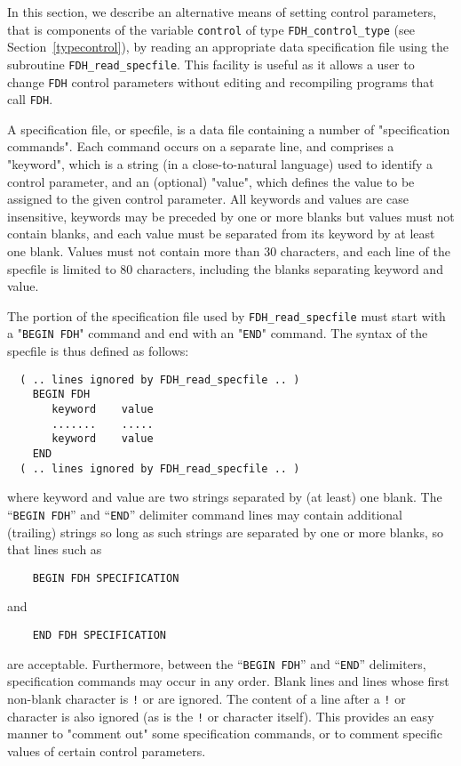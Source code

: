 \documentclass{galahad}
\newcommand{\packagename}{FDH}
\begin{document}

\galfeatures
\noindent In this section, we describe an alternative means of setting 
control parameters, that is components of the variable {\tt control} of type
{\tt \packagename\_control\_type}
(see Section~\ref{typecontrol}), 
by reading an appropriate data specification file using the
subroutine {\tt \packagename\_read\_specfile}. This facility
is useful as it allows a user to change  {\tt \packagename} control parameters 
without editing and recompiling programs that call {\tt \packagename}.

A specification file, or specfile, is a data file containing a number of 
"specification commands". Each command occurs on a separate line, 
and comprises a "keyword", 
which is a string (in a close-to-natural language) used to identify a 
control parameter, and 
an (optional) "value", which defines the value to be assigned to the given
control parameter. All keywords and values are case insensitive, 
keywords may be preceded by one or more blanks but
values must not contain blanks, and
each value must be separated from its keyword by at least one blank.
Values must not contain more than 30 characters, and 
each line of the specfile is limited to 80 characters,
including the blanks separating keyword and value.

The portion of the specification file used by 
{\tt \packagename\_read\_specfile}
must start
with a "{\tt BEGIN \packagename}" command and end with an 
"{\tt END}" command.  The syntax of the specfile is thus defined as follows:
\begin{verbatim}
  ( .. lines ignored by FDH_read_specfile .. )
    BEGIN FDH
       keyword    value
       .......    .....
       keyword    value
    END 
  ( .. lines ignored by FDH_read_specfile .. )
\end{verbatim}
where keyword and value are two strings separated by (at least) one blank.
The ``{\tt BEGIN \packagename}'' and ``{\tt END}'' delimiter command lines 
may contain additional (trailing) strings so long as such strings are 
separated by one or more blanks, so that lines such as
\begin{verbatim}
    BEGIN FDH SPECIFICATION
\end{verbatim}
and
\begin{verbatim}
    END FDH SPECIFICATION
\end{verbatim}
are acceptable. Furthermore, 
between the
``{\tt BEGIN \packagename}'' and ``{\tt END}'' delimiters,
specification commands may occur in any order.  Blank lines and
lines whose first non-blank character is {\tt !} or {\tt *} are ignored. 
The content 
of a line after a {\tt !} or {\tt *} character is also 
ignored (as is the {\tt !} or {\tt *}
character itself). This provides an easy manner to "comment out" some 
specification commands, or to comment specific values 
of certain control parameters.  
\end{document}
